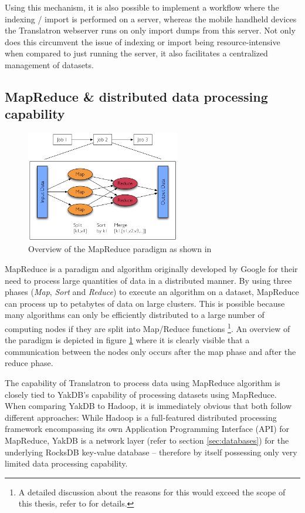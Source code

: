 \documentclass[a4paper, 12pt, twoside, reqn]{report}
\numberwithin{figure}{chapter}
\newtheorem[L]{boxedDefinition}{Definition}
\newtheorem[L]{boxedExample}{Example}
\begin{document}
Using this mechanism, it is also possible to implement a workflow where the indexing / import is performed on a server, whereas the mobile handheld devices the Translatron webserver runs on only import dumps from this server. Not only does this circumvent the issue of indexing or import being resource-intensive when compared to just running the server, it also facilitates a centralized management of datasets.

\subsection{MapReduce \& distributed data processing capability}\label{ssec:mapreduce}

\begin{figure}[!htb]
  \centering
  \includegraphics[width=0.60\textwidth]{Figures/Fig25.eps}
  \caption[MapReduce overview]{Overview of the MapReduce paradigm as shown in \cite[figure 2.5]{wachinger2013next}}
  \label{fig:mapreduce-overview}
\end{figure}

MapReduce is a paradigm and algorithm originally developed by Google for their need to process large quantities of data in a distributed manner. By using three phases (\textit{Map}, \textit{Sort} and \textit{Reduce}) to execute an algorithm on a dataset, MapReduce can process up to petabytes of data on large clusters. This is possible because many algorithms can only be efficiently distributed to a large number of computing nodes if they are split into Map/Reduce functions \footnote{A detailed discussion about the reasons for this would exceed the scope of this thesis, refer to \cite{dean2008mapreduce} for details.}. An overview of the paradigm is depicted in figure \ref{fig:mapreduce-overview}  where it is clearly visible that a communication between the nodes only occurs after the map phase and after the reduce phase.

The capability of Translatron to process data using MapReduce algorithm is closely tied to YakDB's capability of processing datasets using MapReduce.
When comparing YakDB to Hadoop, it is immediately obvious that both follow different approaches: While Hadoop is a full-featured distributed processing framework encompassing its own Application Programming Interface (API) for MapReduce, YakDB is a network layer (refer to section \ref{sec:databases}) for the underlying RocksDB key-value database -- therefore by itself possessing only very limited data processing capability.
\end{document}
